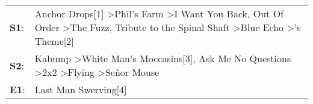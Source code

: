 \begin{supertabular}{p{0.03\textwidth}p{0.92\textwidth}}
 \textbf{S1}:  &  Anchor Drops[1]\textsuperscript{} \textgreater \enspace Phil's Farm\textsuperscript{} \textgreater \enspace I Want You Back\textsuperscript{}, \enspace Out Of Order\textsuperscript{} \textgreater \enspace The Fuzz\textsuperscript{}, \enspace Tribute to the Spinal Shaft\textsuperscript{} \textgreater \enspace Blue Echo\textsuperscript{} \textgreater {}'s Theme[2]\textsuperscript{}  \enspace  \\
 \textbf{S2}:  &                                                                                                                 Kabump\textsuperscript{} \textgreater \enspace White Man's Moccasins[3]\textsuperscript{}, \enspace Ask Me No Questions\textsuperscript{} \textgreater \enspace 2x2\textsuperscript{} \textgreater \enspace Flying\textsuperscript{} \textgreater \enspace Señor Mouse\textsuperscript{}  \enspace  \\
 \textbf{E1}:  &                                                                                                                                                                                                                                                                                                                                                                   Last Man Swerving[4]\textsuperscript{}  \enspace  \\
\end{supertabular}
